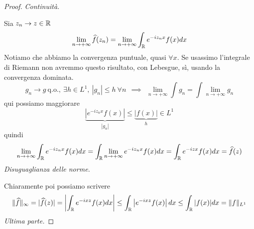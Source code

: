\begin{proof}

\textit{Continuità.}

Sia $z_{n}\rightarrow z\in \mathbb{R}$
\begin{equation*}
\lim\limits_{n\rightarrow + \infty}\widehat{f}(z_{n}) = \lim\limits_{n\rightarrow + \infty}\int_{\mathbb{R}} e^{- iz_{n} x} f(x) dx
\end{equation*}
Notiamo che abbiamo la convergenza puntuale, quasi $\forall x$. Se usassimo l'integrale di Riemann non avremmo questo risultato, con Lebesgue, sì, usando la convergenza dominata.
\begin{equation*}
g_{n}\rightarrow g\ \text{q.o.}, \ \exists h\in L^{1}, \ | g_{n}| \leq h\ \forall n\ \ \implies \ \ \lim\limits_{n\rightarrow + \infty}\int g_{n} = \int \lim\limits_{n\rightarrow + \infty} g_{n}
\end{equation*}
qui possiamo maggiorare
\begin{equation*}
\underbrace{\left| e^{- iz_{n} x} f(x)\right|}_{| g_{n}|} \leq \underbrace{| f(x)|}_{h} \in L^{1}
\end{equation*}
quindi
\begin{equation*}
\lim\limits_{n\rightarrow + \infty}\int_{\mathbb{R}} e^{- iz_{n} x} f(x) dx = \int_{\mathbb{R}}\lim\limits_{n\rightarrow + \infty} e^{- iz_{n} x} f(x) dx = \int_{\mathbb{R}} e^{- izx} f(x) dx = \widehat{f}(z)
\end{equation*}
\textit{Disuguaglianza delle norme.}

Chiaramente poi possiamo scrivere
\begin{equation*}
\Vert \widehat{f} \Vert_{\infty} = | \widehat{f}(z)| = \left| \int_{\mathbb{R}} e^{- ixz} f(x) dx\right| \leq \int_{\mathbb{R}}\left| e^{- ixz} f(x)\right| dx\leq \int_{\mathbb{R}}| f(x)| dx = \Vert f \Vert_{L^{1}}
\end{equation*}
\textit{Ultima parte.}


\end{proof}
